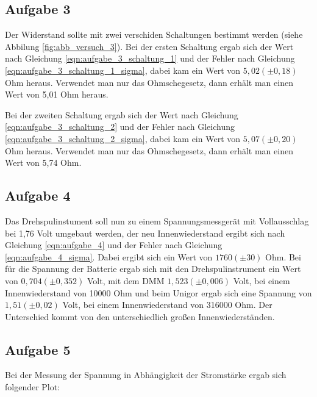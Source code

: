 \documentclass[12pt]{scrartcl}
\begin{document}
\subsection{Aufgabe 3}
Der Widerstand sollte mit zwei verschiden Schaltungen bestimmt werden (siehe Abbilung \ref{fig:abb_versuch_3}).
Bei der ersten Schaltung ergab sich der Wert nach Gleichung \ref{eqn:aufgabe_3_schaltung_1} und der Fehler nach Gleichung \ref{eqn:aufgabe_3_schaltung_1_sigma}, dabei kam ein Wert von $5,02	(\pm 0,18)$ Ohm heraus.
Verwendet man nur das Ohmschegesetz, dann erhält man einen Wert von 5,01 Ohm heraus.

Bei der zweiten Schaltung ergab sich der Wert nach Gleichung \ref{eqn:aufgabe_3_schaltung_2} und der Fehler nach Gleichung \ref{eqn:aufgabe_3_schaltung_2_sigma}, dabei kam ein Wert von $5,07 (\pm 0,20)$ Ohm heraus.
Verwendet man nur das Ohmschegesetz, dann erhält man einen Wert von 5,74 Ohm.

\subsection{Aufgabe 4}
Das Drehspulinstument soll nun zu einem Spannungsmessgerät mit Vollausschlag bei 1,76 Volt umgebaut werden, der neu Innenwiederstand ergibt sich nach Gleichung \ref{eqn:aufgabe_4} und der Fehler nach Gleichung \ref{eqn:aufgabe_4_sigma}.
Dabei ergibt sich ein Wert von $1760 (\pm 30)$ Ohm.
Bei für die Spannung der Batterie ergab sich mit den Drehspulinstrument ein Wert von $0,704 (\pm 0,352)$ Volt, mit dem DMM $1,523 (\pm 0,006)$ Volt, bei einem Innenwiederstand von 10000 Ohm und beim Unigor ergab sich eine Spannung von $1,51 (\pm 0,02)$ Volt, bei einem Innenwiederstand von 316000 Ohm.
Der Unterschied kommt von den unterschiedlich großen Innenwiederständen.

\subsection{Aufgabe 5}
Bei der Messung der Spannung in Abhängigkeit der Stromstärke ergab sich folgender Plot:
\end{document}
